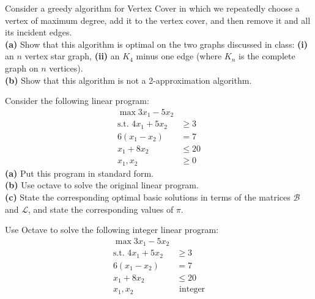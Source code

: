 \documentclass[fleqn]{homework}
\begin{document}
  \maketitle

  \begin{problem}{1}
    \begin{question}
      Consider a greedy algorithm for Vertex Cover in which we repeatedly choose
      a vertex of maximum degree, add it to the vertex cover, and then remove it
      and all its incident edges. \\
      \textbf{(a)} Show that this algorithm is optimal on the two graphs
      discussed in class: \textbf{(i)} an $n$ vertex star graph, \textbf{(ii)}
      an $K_4$ minus one edge (where $K_n$ is the complete graph on $n$ vertices).\\
      \textbf{(b)} Show that this algorithm is not a 2-approximation algorithm.
    \end{question}
  \end{problem}

  \begin{problem}{2}
    \begin{question}
      Consider the following linear program:
      \begin{align*}
        \max 3x_1 - 5x_2 & \\
        \text{s.t.  } 4x_1 + 5x_2 &\ge 3 \\
        6(x_1 - x_2) &= 7 \\
        x_1 + 8x_2 &\le 20 \\
        x_1, x_2 &\ge 0
      \end{align*}
      \textbf{(a)} Put this program in standard form.\\
      \textbf{(b)} Use octave to solve the original linear program.\\
      \textbf{(c)} State the corresponding optimal basic solutions in terms of
      the matrices $\mathcal{B}$ and $\mathcal{L}$, and state the corresponding
      values of $\pi$.
    \end{question}
  \end{problem}

  \begin{problem}{3}
    \begin{question}
      Use Octave to solve the following integer linear program:
      \begin{align*}
        \max 3x_1 - 5x_2 & \\
        \text{s.t.  } 4x_1 + 5x_2 &\ge 3 \\
        6(x_1 - x_2) &= 7 \\
        x_1 + 8x_2 &\le 20 \\
        x_1, x_2 &\text{ integer}
      \end{align*}
    \end{question}
  \end{problem}
\end{document}
